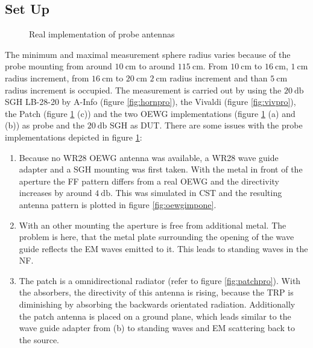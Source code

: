 \subsection{Set Up}

\begin{figure}[H]
  \centering
  \centering
  \centering
\caption{Real implementation of probe antennas}
\label{fig:realprobe}
\end{figure}

The minimum and maximal measurement sphere radius varies because of the probe mounting from around $\SI{10}{\centi\meter}$ to around $\SI{115}{\centi\meter}$. From $\SI{10}{\centi\meter}$ to $\SI{16}{\centi\meter}$, $\SI{1}{\centi\meter}$ radius increment, from $\SI{16}{\centi\meter}$ to $\SI{20}{\centi\meter}$ $\SI{2}{\centi\meter}$ radius increment and than $\SI{5}{\centi\meter}$ radius increment is occupied. The measurement is carried out by using the $\SI{20}{\decibel}$ \ac{SGH} LB-28-20 by A-Info (figure \ref{fig:hornpro}), the Vivaldi (figure \ref{fig:vivpro}), the Patch (figure \ref{fig:realprobe} (c)) and the two \ac{OEWG} implementations (figure \ref{fig:realprobe} (a) and (b)) as probe and the $\SI{20}{\decibel}$ \ac{SGH} as \ac{DUT}. There are some issues with the probe implementations depicted in figure \ref{fig:realprobe}:

\begin{enumerate}[label=(\alph*)]
\item Because no WR28 \ac{OEWG} antenna was available, a WR28 wave guide adapter and a \ac{SGH} mounting was first taken. With the metal in front of the aperture the \ac{FF} pattern differs from a real \ac{OEWG} and the directivity increases by around $\SI{4}{\decibel}$. This was simulated in CST\texttrademark{} and the resulting antenna pattern is plotted in figure \ref{fig:oewgimpone}.
\item With an other mounting the aperture is free from additional metal. The problem is here, that the metal plate surrounding the opening of the wave guide reflects the \ac{EM} waves emitted to it. This leads to standing waves in the \ac{NF}.
\item The patch is a omnidirectional radiator (refer to figure \ref{fig:patchpro}). With the absorbers, the directivity of this antenna is rising, because the \ac{TRP} is diminishing by absorbing the backwards orientated radiation. Additionally the patch antenna is placed on a ground plane, which leads similar to the wave guide adapter from (b) to standing waves and \ac{EM} scattering back to the source.
\end{enumerate}

